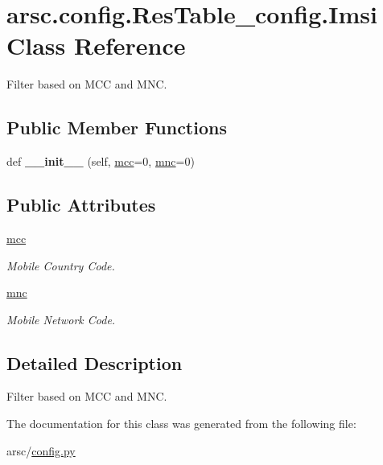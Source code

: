 \hypertarget{classarsc_1_1config_1_1ResTable__config_1_1Imsi}{}\section{arsc.\+config.\+Res\+Table\+\_\+config.\+Imsi Class Reference}
\label{classarsc_1_1config_1_1ResTable__config_1_1Imsi}


Filter based on M\+CC and M\+NC.  


\subsection*{Public Member Functions}
\begin{DoxyCompactItemize}
\item 
\mbox{\label{classarsc_1_1config_1_1ResTable__config_1_1Imsi_a43f78480e529c7a032be43e18344b626}} 
def {\bfseries \+\_\+\+\_\+init\+\_\+\+\_\+} (self, \mbox{\hyperlink{classarsc_1_1config_1_1ResTable__config_1_1Imsi_aab990d0a363a63813c0d686ae7e1f54b}{mcc}}=0, \mbox{\hyperlink{classarsc_1_1config_1_1ResTable__config_1_1Imsi_acf991b66dce86e39c571064fa23f08ad}{mnc}}=0)
\end{DoxyCompactItemize}
\subsection*{Public Attributes}
\begin{DoxyCompactItemize}
\item 
\mbox{\label{classarsc_1_1config_1_1ResTable__config_1_1Imsi_aab990d0a363a63813c0d686ae7e1f54b}} 
\mbox{\hyperlink{classarsc_1_1config_1_1ResTable__config_1_1Imsi_aab990d0a363a63813c0d686ae7e1f54b}{mcc}}
\begin{DoxyCompactList}\small\item\em Mobile Country Code. \end{DoxyCompactList}\item 
\mbox{\label{classarsc_1_1config_1_1ResTable__config_1_1Imsi_acf991b66dce86e39c571064fa23f08ad}} 
\mbox{\hyperlink{classarsc_1_1config_1_1ResTable__config_1_1Imsi_acf991b66dce86e39c571064fa23f08ad}{mnc}}
\begin{DoxyCompactList}\small\item\em Mobile Network Code. \end{DoxyCompactList}\end{DoxyCompactItemize}


\subsection{Detailed Description}
Filter based on M\+CC and M\+NC. 

The documentation for this class was generated from the following file\+:\begin{DoxyCompactItemize}
\item 
arsc/\mbox{\hyperlink{config_8py}{config.\+py}}\end{DoxyCompactItemize}
